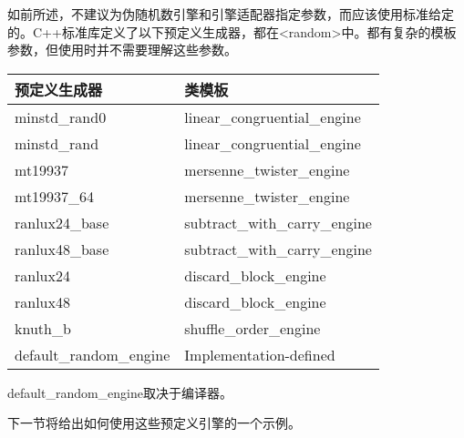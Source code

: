 如前所述，不建议为伪随机数引擎和引擎适配器指定参数，而应该使用标准给定的。C++标准库定义了以下预定义生成器，都在<random>中。都有复杂的模板参数，但使用时并不需要理解这些参数。

\begin{longtable}{|l|l|}
\hline
\textbf{预定义生成器} & \textbf{类模板}       \\ \hline
\endfirsthead
%
\endhead
%
minstd\_rand0                 & linear\_congruential\_engine  \\ \hline
minstd\_rand                  & linear\_congruential\_engine  \\ \hline
mt19937                       & mersenne\_twister\_engine     \\ \hline
mt19937\_64                   & mersenne\_twister\_engine     \\ \hline
ranlux24\_base                & subtract\_with\_carry\_engine \\ \hline
ranlux48\_base                & subtract\_with\_carry\_engine \\ \hline
ranlux24                      & discard\_block\_engine        \\ \hline
ranlux48                      & discard\_block\_engine        \\ \hline
knuth\_b                      & shuffle\_order\_engine        \\ \hline
default\_random\_engine       & Implementation-defined        \\ \hline
\end{longtable}

default\_random\_engine取决于编译器。

下一节将给出如何使用这些预定义引擎的一个示例。

















